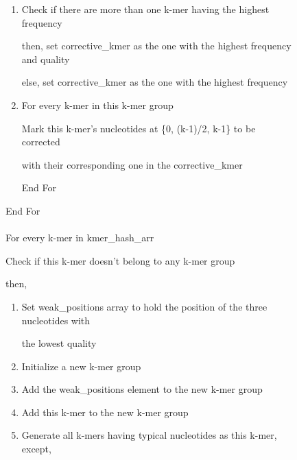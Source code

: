 \documentclass[12pt,openany]{llncs}
\begin{document}
\begin{figure}
\begin{bordered}
\begin{enumerate}
  \item Check if there are more than one k-mer having the highest frequency

  \noindent\hspace{1cm} then, set corrective\_kmer as the one with the highest frequency and quality

  \noindent\hspace{1cm} else, set corrective\_kmer as the one with the highest frequency

  \item For every k-mer in this k-mer group

  \noindent\hspace{1.4cm}Mark this k-mer's nucleotides at \{0, (k-1)/2, k-1\} to be corrected 
  
  \noindent\hspace{1.4cm}with their corresponding one in the corrective\_kmer
  
  \noindent\hspace{1cm} End For
\end{enumerate}            
\vspace{-3mm}

End For
\\
\\
For every k-mer in kmer\_hash\_arr

\noindent\hspace{0.4cm} Check if this k-mer doesn't belong to any k-mer group

\noindent\hspace{0.4cm} then,

\vspace{-2mm}
\begin{enumerate}
\addtolength{\itemindent}{1cm}
	  \item Set weak\_positions array to hold the position of the three nucleotides with 
	  
	  \noindent\hspace{1cm}the lowest quality
	  
	  \item Initialize a new k-mer group

	  \item Add the weak\_positions element to the new k-mer group

	  \item Add this k-mer to the new k-mer group

      \item Generate all k-mers having typical nucleotides as this k-mer, except,
      

\end{enumerate}
\end{bordered}
\end{figure}
\end{document}
